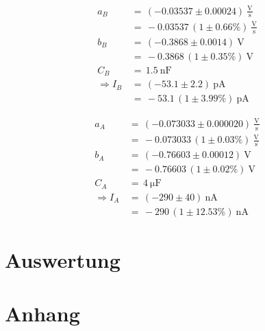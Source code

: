 \documentclass[10pt,a4paper]{scrartcl}
\begin{document}
\begin{align*}
    a_B \,&=\, \left(-0.03537\pm 0.00024\right)~\mathrm{\frac{V}{s}}\\
          &=\, -0.03537 \, \left(1\pm0.66\%\right)~\mathrm{\frac{V}{s}}\\
    b_B \,&=\, \left(-0.3868 \pm 0.0014\right)~\mathrm V\\
          &=\, -0.3868 \, \left(1\pm 0.35\%\right)~\mathrm V\\
    C_B \,&=\,1.5~\mathrm{nF}\\
    \Rightarrow
    I_B \,&=\, \left(-53.1\pm2.2\right)~\mathrm{pA}\\
    &=\, -53.1\,\left(1\pm3.99\%\right)~\mathrm{pA}
\end{align*}

\begin{align*}
    a_A \,&=\, \left(-0.073033\pm 0.000020\right)~\mathrm{\frac{V}{s}}\\
          &=\, -0.073033 \, \left(1\pm0.03\%\right)~\mathrm{\frac{V}{s}}\\
    b_A \,&=\, \left(-0.76603 \pm 0.00012\right)~\mathrm V\\
          &=\, -0.76603 \, \left(1\pm 0.02\%\right)~\mathrm V\\
    C_A \,&=\,4~\mathrm{\mu F}\\
    \Rightarrow
    I_A \,&=\, \left(-290\pm40\right)~\mathrm{nA}\\
    &=\, -290\,\left(1\pm12.53\%\right)~\mathrm{nA}
\end{align*}

\section {Auswertung}



\pagebreak

\section {Anhang}
\end{document}

